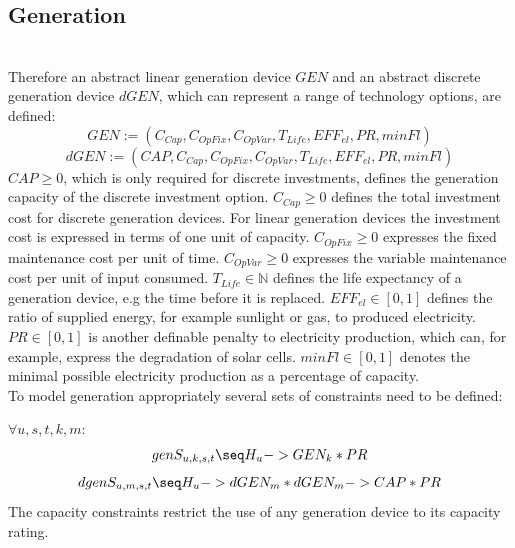 \documentclass[
	11pt,								%
	DIV10,								%
	a4paper,         					%
	oneside,							%
	headheight=20pt,					%
	footheight=20pt,					%
    parskip=full,						%
    listof=totoc,						%
	bibliography=totoc,					%
	index=totoc,						%
]{scrartcl}
\begin{document}
\subsection{Generation}
\\
Therefore an abstract linear generation device $GEN$ and an abstract discrete generation device $dGEN$, which can represent a range of technology options, are defined:\\
	\begin{equation}
		GEN := (C_{Cap}, C_{OpFix}, C_{OpVar}, T_{Life}, EFF_{el}, PR, minFl)
	\end{equation}
	\begin{equation}
		dGEN := (CAP, C_{Cap}, C_{OpFix}, C_{OpVar}, T_{Life}, EFF_{el}, PR, minFl)
	\end{equation}
	$CAP \geq 0$, which is only required for discrete investments, defines the generation capacity of the discrete investment option.
	$C_{Cap} \geq 0$ defines the total investment cost for discrete generation devices. For linear generation devices the investment cost is expressed in terms of one unit of capacity.
	$C_{OpFix} \geq 0$ expresses the fixed maintenance cost per unit of time.
	$C_{OpVar} \geq 0$ expresses the variable maintenance cost per unit of input consumed.
	$T_{Life} \in \mathbb{N}$ defines the life expectancy of a generation device, e.g the time before it is replaced. 
	$EFF_{el} \in [0,1]$ defines the ratio of supplied energy, for example sunlight or gas, to produced electricity.
	$PR \in [0,1]$ is another definable penalty to electricity production, which can, for example, express the degradation of solar cells. 	
	$minFl \in [0,1]$ denotes the minimal possible electricity production as a percentage of capacity.
	\\
	To model generation appropriately several sets of constraints need to be defined:
	
	$\forall u,s,t,k,m$:
	\begin{equation}
		genS_{u,k,s,t} \seq H_u->GEN_k * PR
	\end{equation}
	\begin{equation}
		dgenS_{u,m,s,t} \seq H_u->dGEN_m * dGEN_m->CAP * PR
	\end{equation}
	The capacity constraints restrict the use of any generation device to its capacity rating.
\end{document}
